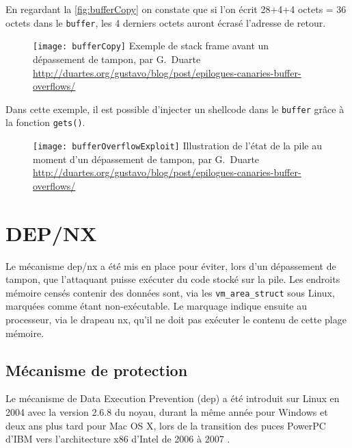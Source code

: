 En regardant la \autoref{fig:bufferCopy} on constate que si l'on écrit 28+4+4 octets = 36 octets dans le \texttt{buffer}, les 4 derniers octets auront écrasé l'adresse de retour.

\begin{figure}[H]
	\centering
	\texttt{[image: bufferCopy]}
	{Exemple de \og stack frame \fg avant un dépassement de tampon, par G.~Duarte}
	{\url{http://duartes.org/gustavo/blog/post/epilogues-canaries-buffer-overflows/}}
	\label{fig:bufferCopy}
\end{figure}

Dans cette exemple, il est possible d'injecter un \og shellcode \fg dans le \texttt{buffer} grâce à la fonction \texttt{gets()}.

\begin{figure}[H]
	\centering
	\texttt{[image: bufferOverflowExploit]}
	{Illustration de l'état de la pile au moment d'un dépassement de tampon, par G.~Duarte}
	{\url{http://duartes.org/gustavo/blog/post/epilogues-canaries-buffer-overflows/}}
	\label{fig:bufferOverflowExploit}
\end{figure}

\vfill

\section{DEP/NX}

Le mécanisme \gls{dep}/\gls{nx} a été mis en place pour éviter, lors d'un dépassement de tampon, que l'attaquant puisse exécuter du code stocké sur la pile. Les endroits mémoire censés contenir des données sont, via les \texttt{vm_area_struct} sous Linux, marquées comme étant non-exécutable. Le marquage indique ensuite au processeur, via le drapeau \gls{nx}, qu'il ne doit pas exécuter le contenu de cette plage mémoire.

\subsection{Mécanisme de protection}

Le mécanisme de Data Execution Prevention (\gls{dep}) a été introduit sur Linux en 2004 avec la version 2.6.8 du noyau, durant la même année pour Windows et deux ans plus tard pour Mac OS X, lors de la transition des puces PowerPC d'IBM vers l'architecture x86 d'Intel de 2006 à 2007 \cite{DataExecutionPrevention, PowerPC}.

